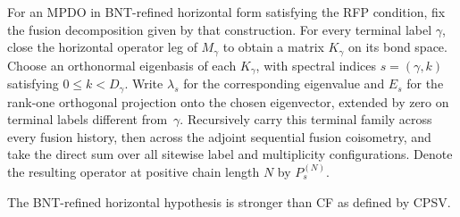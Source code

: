 \begin{definition}%
    \label{def:mpdo_terminal_spectral_refinement}
    \leanok
    For an MPDO in BNT-refined horizontal form satisfying the
    RFP condition, fix the fusion decomposition given by that
    construction. For every terminal label $\gamma$, close the horizontal
    operator leg of $M_\gamma$ to obtain a matrix $K_\gamma$ on its bond
    space. Choose an orthonormal eigenbasis of each $K_\gamma$, with spectral
    indices $s=(\gamma,k)$ satisfying $0\leq k<D_\gamma$.
    Write $\lambda_s$ for the corresponding eigenvalue and $E_s$ for the
    rank-one orthogonal projection onto the chosen eigenvector, extended by
    zero on terminal labels different from~$\gamma$. Recursively carry
    this terminal family across every fusion history, then across the
    adjoint sequential fusion coisometry, and take the direct sum over all
    sitewise label and multiplicity configurations. Denote the resulting
    operator at positive chain length $N$ by $P_s^{(N)}$.

    The BNT-refined horizontal hypothesis is stronger than CF
    as defined by CPSV.
\end{definition}

